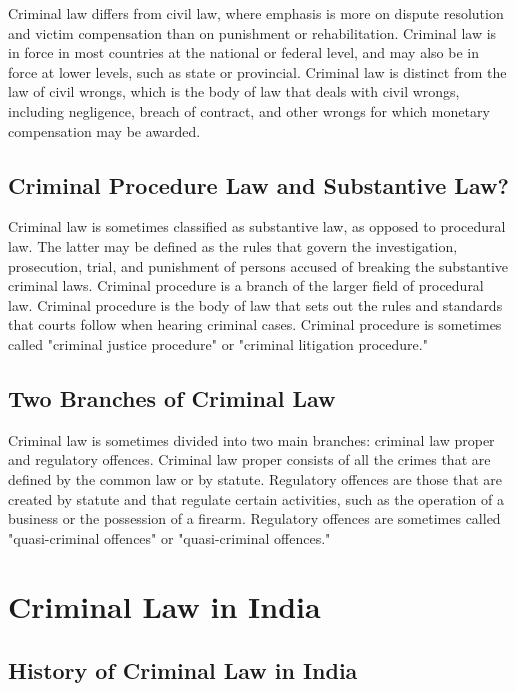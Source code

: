 \documentclass[11pt]{article}
\begin{document}
Criminal law differs from civil law, where emphasis is more on dispute resolution and victim compensation than on punishment or rehabilitation. Criminal law is in force in most countries at the national or federal level, and may also be in force at lower levels, such as state or provincial. Criminal law is distinct from the law of civil wrongs, which is the body of law that deals with civil wrongs, including negligence, breach of contract, and other wrongs for which monetary compensation may be awarded.

\subsection{Criminal Procedure Law and Substantive Law?}

Criminal law is sometimes classified as substantive law, as opposed to procedural law. The latter may be defined as the rules that govern the investigation, prosecution, trial, and punishment of persons accused of breaking the substantive criminal laws. Criminal procedure is a branch of the larger field of procedural law. Criminal procedure is the body of law that sets out the rules and standards that courts follow when hearing criminal cases. Criminal procedure is sometimes called "criminal justice procedure" or "criminal litigation procedure."

\subsection{Two Branches of Criminal Law}

Criminal law is sometimes divided into two main branches: criminal law proper and regulatory offences. Criminal law proper consists of all the crimes that are defined by the common law or by statute. Regulatory offences are those that are created by statute and that regulate certain activities, such as the operation of a business or the possession of a firearm. Regulatory offences are sometimes called "quasi-criminal offences" or "quasi-criminal offences."

\section{Criminal Law in India}

\subsection{History of Criminal Law in India}
\end{document}
